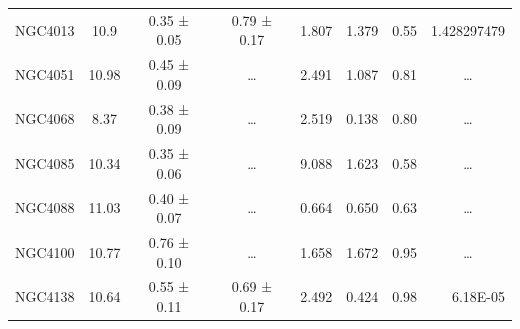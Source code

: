 \documentclass[reprint,%
 amsmath,amssymb,
 aps,
]{revtex4-1}
\begin{document}
\begin{table}[]
\begin{tabular}{cccccrrc}
\rowcolor[HTML]{F3F3F3} 
NGC4013              & 10.9                      & 0.35 ± 0.05           & 0.79 ± 0.17            & 1.807                                                        & 1.379                                                          & 0.55                                                         & \multicolumn{1}{r}{\cellcolor[HTML]{F3F3F3}1.428297479}       \\
\rowcolor[HTML]{F3F3F3} 
NGC4051              & 10.98                     & 0.45 ± 0.09           & …                      & 2.491                                                        & 1.087                                                         & 0.81                                                          & …                                                             \\
\rowcolor[HTML]{F3F3F3} 
NGC4068              & 8.37                      & 0.38 ± 0.09           & …                      & 2.519                                                        & 0.138                                                         & 0.80                                                          & …                                                             \\
\rowcolor[HTML]{F3F3F3} 
NGC4085              & 10.34                     & 0.35 ± 0.06           & …                      & 9.088                                                        & 1.623                                                          & 0.58                                                         & …                                                             \\
\rowcolor[HTML]{F3F3F3} 
NGC4088              & 11.03                     & 0.40 ± 0.07           & …                      & 0.664                                                        & 0.650                                                         & 0.63                                                         & …                                                             \\
\rowcolor[HTML]{F3F3F3} 
NGC4100              & 10.77                     & 0.76 ± 0.10           & …                      & 1.658                                                        & 1.672                                                           & 0.95                                                         & …                                                             \\
\rowcolor[HTML]{F3F3F3} 
NGC4138              & 10.64                     & 0.55 ± 0.11           & 0.69 ± 0.17            & 2.492                                                        & 0.424                                                          & 0.98                                                          & \multicolumn{1}{r}{\cellcolor[HTML]{F3F3F3}6.18E-05}          \\

\end{tabular}
\end{table}
\end{document}
